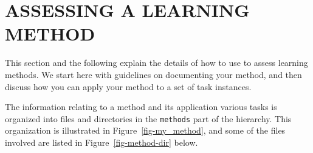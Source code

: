 %
%
\newpage

\section{ASSESSING A LEARNING METHOD}\label{sec-assess}
\thispagestyle{plain}
\setcounter{figure}{0}

This section and the following explain the details of how to use
\delve{} to assess learning methods. We start here with guidelines on
documenting your method, and then discuss how you can apply your
method to a set of task instances.

The information relating to a method and its application various tasks
is organized into files and directories in the \texttt{methods} part
of the \delve{} hierarchy.  This organization is illustrated in
Figure~\ref{fig-my_method}, and some of the files involved are listed
in Figure~\ref{fig-method-dir} below.


